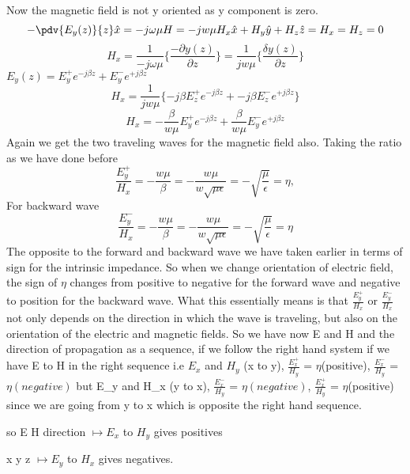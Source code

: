 Now the magnetic field is not y oriented as y component is zero.
\begin{dmath*}
-\pdv{E_y(z)}{z}\hat{x} = -j\omega\mu H = -jw\mu H_x\hat{x} + H_y\hat{y} + H_z\hat{z} = H_x = H_z = 0
\end{dmath*}
\begin{dmath*}
H_x = \frac{1}{-j\omega\mu}\{\frac{-\partial y(z)}{\partial z}\} = \frac{1}{jw\mu}\{\frac{\delta y(z)}{\partial z}\}
\end{dmath*} 
$E_y(z) = E_y^+ e^{-j\beta z} + E_y^- e^{+j\beta z}$
\begin{dmath*}
H_x= \frac{1}{jw\mu} \{-j\beta E_z^+e^{-j\beta z} + -j\beta E_z^-e^{+j\beta z} \}
\end{dmath*}
\begin{dmath*}
H_x = - \frac{\beta}{w\mu} E_y^+e^{-j\beta z} +\frac{\beta}{w\mu}E_y^-e^{+j\beta z}
\end{dmath*}
Again we get the two traveling waves for the magnetic field also. Taking the ratio as we have done before 
\begin{dmath*}
\frac{E_y^+}{H_x} = -\frac{w\mu}{\beta} = -\frac{w\mu}{w\sqrt{\mu \epsilon}} = -\sqrt{\frac{\mu}{\epsilon}} = \eta,
\end{dmath*}
For backward wave
\begin{dmath*}
\frac{E_y^-}{H_x} = -\frac{w\mu}{\beta} = -\frac{w\mu}{w\sqrt{\mu \epsilon}} = -\sqrt{\frac{\mu}{\epsilon}} = \eta
\end{dmath*}
The opposite to the forward and backward wave we have taken earlier in terms of sign for the intrinsic impedance. So when we change orientation of electric field, the sign of $\eta$ changes from positive to negative for the forward wave and negative to position for the backward wave. What this essentially means is that $\frac{E_y^+}{H_x}$ or $\frac{E_y^-}{H_x}$ not only depends on the direction in which the wave is traveling, but also on the orientation of the electric and magnetic fields. So we have now E and H and the direction of propagation as a sequence, if we follow the right hand system if we have E to H in the right sequence i.e $E_x$ and $H_y$ (x to y), $\frac{E_x^+}{H_y}$ = $\eta$(positive), $\frac{E_x^-}{H_y}$ = $\eta(negative)$ but E_y and H_x (y to x), $\frac{E_x^-}{H_y}$ = $\eta(negative)$, $\frac{E_x^+}{H_y}$ = $\eta$(positive) since we are going from y to x which is opposite the right hand sequence.

so E H direction $\longmapsto E_x$ to $H_y$ gives positives

x  y z $\longmapsto E_y$ to $H_x$ gives negatives. 

